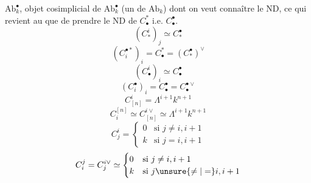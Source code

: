 { $\mathrm{Ab}_k^\bullet$, 
objet cosimplicial de $\mathrm{Ab}_k^\bullet$
(un  de $\mathrm{Ab}_k$) dont on veut connaître le ND,
ce qui revient au  que de prendre le ND
\uline{} de $C_\bullet^*$ i.e. $C_\bullet^\bullet$.
\[
(C_*^i)_j\simeq C_*^\bullet
\]
\[
(C_i^{\bullet *})_i=C_\bullet^*=(C_*^\bullet)^\vee
\]
\[
(C_\bullet^i)_i\simeq C_\bullet^\bullet
\]
\[
(C_i^\bullet)_i=C_\bullet^\bullet=C_\bullet^{\bullet\vee}
\]
\[
C_{[n]}^i=\Lambda^{i+1}k^{n+1}
\]
\[
C_i^{[n]}\simeq C_{[n]}^{i\vee}\simeq\Lambda^{i+1}k^{n+1}
\]
\[
C_j^i=\begin{cases}0&\text{si }j\ne i,i+1\\
k&\text{si }j=i,i+1\end{cases}
\]
\[
C_i^j=C_j^{i\vee}\simeq
\begin{cases}0&\text{si }j\ne i,i+1\\
k&\text{si }j\unsure{\ne|=}i,i+1\end{cases}
\]
}
